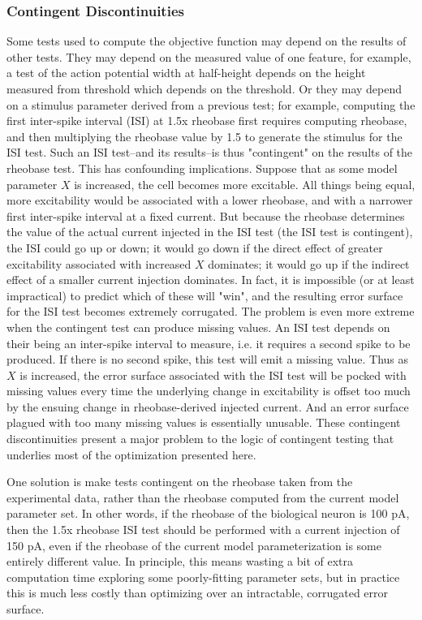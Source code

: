 \subsubsection{Contingent Discontinuities}
Some tests used to compute the objective function may depend on the results of other tests.
They may depend on the measured value of one feature, for example, a test of the action potential width at half-height depends on the height measured from threshold which depends on the threshold.
Or they may depend on a stimulus parameter derived from a previous test; for example, computing the first inter-spike interval (ISI) at 1.5x rheobase first requires computing rheobase, and then multiplying the rheobase value by 1.5 to generate the stimulus for the ISI test.
Such an ISI test--and its results--is thus "contingent" on the results of the rheobase test.
This has confounding implications.
Suppose that as some model parameter $X$ is increased, the cell becomes more excitable.
All things being equal, more excitability would be associated with a lower rheobase, and with a narrower first inter-spike interval at a fixed current.
But because the rheobase determines the value of the actual current injected in the ISI test (the ISI test is contingent), the ISI could go up or down; it would go down if the direct effect of greater excitability associated with increased $X$ dominates; it would go up if the indirect effect of a smaller current injection dominates.
In fact, it is impossible (or at least impractical) to predict which of these will "win", and the resulting error surface for the ISI test becomes extremely corrugated.
The problem is even more extreme when the contingent test can produce missing values.
An ISI test depends on their being an inter-spike interval to measure, i.e. it requires a second spike to be produced.
If there is no second spike, this test will emit a missing value.
Thus as $X$ is increased, the error surface associated with the ISI test will be pocked with missing values every time the underlying change in excitability is offset too much by the ensuing change in rheobase-derived injected current.
And an error surface plagued with too many missing values is essentially unusable.
These contingent discontinuities present a major problem to the logic of contingent testing that underlies most of the optimization presented here.

One solution is make tests contingent on the rheobase taken from the experimental data, rather than the rheobase computed from the current model parameter set.
In other words, if the rheobase of the biological neuron is 100 pA, then the 1.5x rheobase ISI test should be performed with a current injection of 150 pA, even if the rheobase of the current model parameterization is some entirely different value.
In principle, this means wasting a bit of extra computation time exploring some poorly-fitting parameter sets, but in practice this is much less costly than optimizing over an intractable, corrugated error surface.


